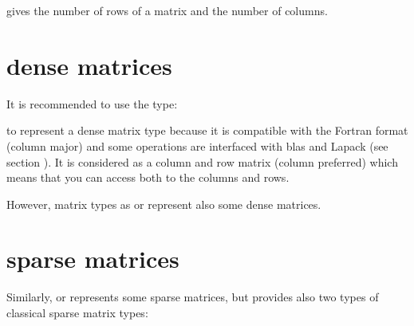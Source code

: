 \documentclass[a4paper,11pt,english]{sphinxmanual}
\begin{document}
\sphinxAtStartPar
{} gives the number of rows of a matrix and  the number of columns.


\section{dense matrices}
\label{\detokenize{gmm/matrix:dense-matrices}}
\sphinxAtStartPar
It is recommended to use the type:

\begin{sphinxVerbatim}[commandchars=\\\{\}]
\end{sphinxVerbatim}

\sphinxAtStartPar
to represent a dense matrix type because it is compatible with the Fortran format (column major) and some operations are interfaced with blas and Lapack (see section  {\hyperref[\detokenize{gmm/blas_interface:gmm-lapack}]{}}). It is considered as a column and row matrix (column preferred) which means that you can access both to the columns and rows.

\sphinxAtStartPar
However, matrix types as  or  represent also some dense matrices.


\section{sparse matrices}
\label{\detokenize{gmm/matrix:sparse-matrices}}
\sphinxAtStartPar
Similarly,  or  represents some sparse matrices, but  provides also two types of classical sparse matrix types:

\begin{sphinxVerbatim}[commandchars=\\\{\}]
\end{sphinxVerbatim}
\end{document}
